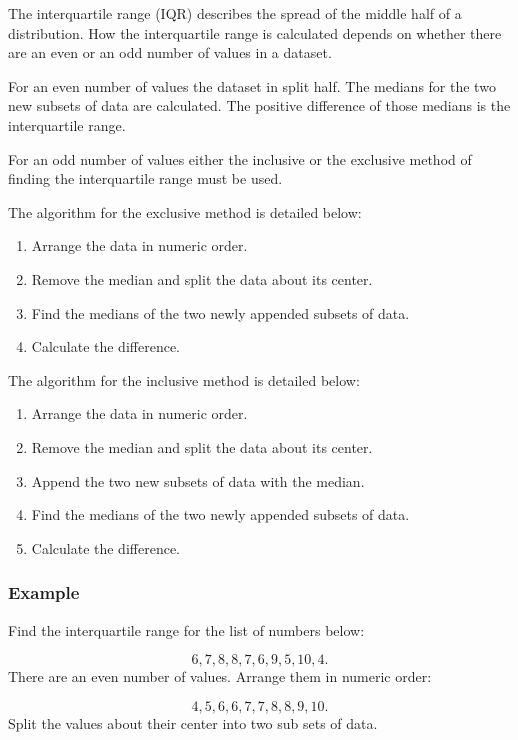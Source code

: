 \documentclass[
]{book}
\providecommand{\tightlist}{%
  \setlength{\itemsep}{0pt}\setlength{\parskip}{0pt}}
\begin{document}
The interquartile range (IQR) describes the spread of the middle half of a distribution. How the interquartile range is calculated depends on whether there are an even or an odd number of values in a dataset.

For an even number of values the dataset in split half. The medians for the two new subsets of data are calculated. The positive difference of those medians is the interquartile range.

For an odd number of values either the inclusive or the exclusive method of finding the interquartile range must be used.

The algorithm for the exclusive method is detailed below:

\begin{enumerate}
\def\labelenumi{\arabic{enumi}.}
\tightlist
\item
  Arrange the data in numeric order.
\item
  Remove the median and split the data about its center.
\item
  Find the medians of the two newly appended subsets of data.
\item
  Calculate the difference.
\end{enumerate}

The algorithm for the inclusive method is detailed below:

\begin{enumerate}
\def\labelenumi{\arabic{enumi}.}
\tightlist
\item
  Arrange the data in numeric order.
\item
  Remove the median and split the data about its center.
\item
  Append the two new subsets of data with the median.
\item
  Find the medians of the two newly appended subsets of data.
\item
  Calculate the difference.
\end{enumerate}

\hypertarget{example-8}{%
\subsubsection{Example}\label{example-8}}

Find the interquartile range for the list of numbers below:

\[6, 7, 8, 8, 7, 6, 9, 5, 10, 4. \]
There are an even number of values. Arrange them in numeric order:

\[ 4, 5, 6, 6, 7, 7, 8, 8, 9, 10.\]
Split the values about their center into two sub sets of data.
\end{document}
